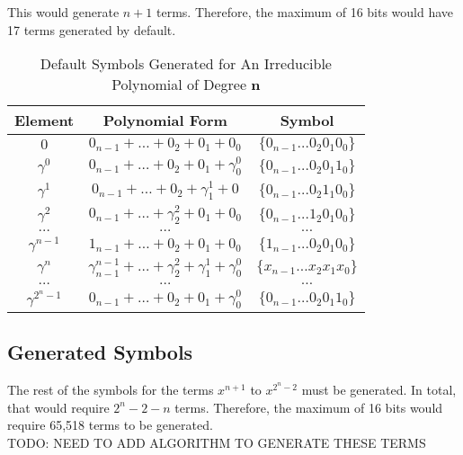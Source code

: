 \documentclass[paper=usletter, fontsize=12pt]{article}
\begin{document}
        This would generate $n+1$ terms. Therefore, the maximum of 16 bits would have 17 terms generated by default.

       \begin{table}[h]
            \def\arraystretch{2.5}
            \caption{Default Symbols Generated for An Irreducible Polynomial of Degree $\bm{n}$}
            \centering
            \begin{tabular*}{300pt}{@{\extracolsep{\fill}} ccc}

            \textbf{Element} & \textbf{Polynomial Form} & \textbf{Symbol} \\
            \hline
            $0$                 & $0_{n-1} + \ldots + 0_{2} + 0_{1} + 0_{0}$                                           & $\{0_{n-1}\ldots0_{2}0_{1}0_{0}\}$  \\
            $\gamma^{0}$        & $0_{n-1} + \ldots + 0_{2} + 0_{1} + \gamma^{0}_{0}$                                  & $\{0_{n-1}\ldots0_{2}0_{1}1_{0}\}$ \\
            $\gamma^{1}$        & $0_{n-1} + \ldots + 0_{2} + \gamma^{1}_{1} + 0$                                      & $\{0_{n-1}\ldots0_{2}1_{1}0_{0}\}$ \\
            $\gamma^{2}$        & $0_{n-1} + \ldots + \gamma^{2}_{2} + 0_{1} + 0_{0}$                                  & $\{0_{n-1}\ldots1_{2}0_{1}0_{0}\}$ \\
            $\ldots$            & $\ldots$                                                                             & $\ldots$ \\
            $\gamma^{n-1}$      & $1_{n-1} + \ldots + 0_{2} + 0_{1} + 0_{0}$                                           & $\{1_{n-1}\ldots 0_{2}0_{1}0_{0}\}$ \\
            $\gamma^{n}$        & $\gamma^{n-1}_{n-1} + \ldots + \gamma^{2}_{2} + \gamma^{1}_{1} + \gamma^{0}_{0}$     & $\{x_{n-1}\ldots x_{2}x_{1}x_{0}\}$ \\
            $\ldots$            & $\ldots$                                                                             & $\ldots$ \\
            $\gamma^{2^{n}-1}$  & $0_{n-1} + \ldots + 0_{2} + 0_{1} + \gamma^{0}_{0}$                                  & $\{0_{n-1}\ldots0_{2}0_{1}1_{0}\}$ \\
            \end{tabular*}
        \end{table}

        \subsection{Generated Symbols}
        The rest of the symbols for the terms $x^{n+1}$ to $x^{2^{n}-2}$ must be generated. In total, that would require $2^{n}-2-n$ terms. Therefore, the maximum of 16 bits would require 65,518 terms to be generated. \\
        TODO: NEED TO ADD ALGORITHM TO GENERATE THESE TERMS
\end{document}

